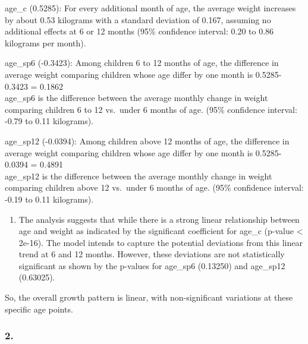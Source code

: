 \documentclass[
]{article}
\providecommand{\tightlist}{%
  \setlength{\itemsep}{0pt}\setlength{\parskip}{0pt}}
\begin{document}
age\_c (0.5285): For every additional month of age, the average weight
increases by about 0.53 kilograms with a standard deviation of 0.167,
assuming no additional effects at 6 or 12 months (95\% confidence
interval: 0.20 to 0.86 kilograms per month).

age\_sp6 (-0.3423): Among children 6 to 12 months of age, the difference
in average weight comparing children whose age differ by one month is
0.5285-0.3423 = 0.1862\\
age\_sp6 is the difference between the average monthly change in weight
comparing children 6 to 12 vs.~under 6 months of age. (95\% confidence
interval: -0.79 to 0.11 kilograms).

age\_sp12 (-0.0394): Among children above 12 months of age, the
difference in average weight comparing children whose age differ by one
month is 0.5285-0.0394 = 0.4891\\
age\_sp12 is the difference between the average monthly change in weight
comparing children above 12 vs.~under 6 months of age. (95\% confidence
interval: -0.19 to 0.11 kilograms).

\begin{enumerate}
\def\labelenumi{\alph{enumi}.}
\setcounter{enumi}{5}
\tightlist
\item
  The analysis suggests that while there is a strong linear relationship
  between age and weight as indicated by the significant coefficient for
  age\_c (p-value \textless{} 2e-16). The model intends to capture the
  potential deviations from this linear trend at 6 and 12 months.
  However, these deviations are not statistically significant as shown
  by the p-values for age\_sp6 (0.13250) and age\_sp12 (0.63025).
\end{enumerate}

So, the overall growth pattern is linear, with non-significant
variations at these specific age points.

\subsubsection{2.}\label{section-4}
\end{document}
